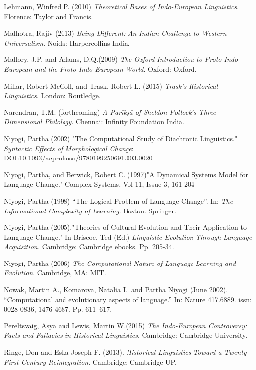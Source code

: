 \begin{thebibliography}{99}
  Lehmann, Winfred P. (2010) \textit{Theoretical Bases of Indo-European Linguistics}. Florence: Taylor and Francis.

  Malhotra, Rajiv (2013) \textit{Being Different: An Indian Challenge to Western Universalism}. Noida: Harpercollins India.

  Mallory, J.P. and Adams, D.Q.(2009) \textit{The Oxford Introduction to Proto-Indo-European and the Proto-Indo-European World}. Oxford: Oxford.

  Millar, Robert McColl, and Trask, Robert L. (2015) \textit{Trask's Historical Linguistics}. London: Routledge.

  Narendran, T.M. (forthcoming) \textit{A Parīkṣā of Sheldon Pollock’s Three Dimensional Philology}. Chennai: Infinity Foundation India.

  Niyogi, Partha (2002) "The Computational Study of Diachronic Linguistics." \textit{Syntactic Effects of Morphological Change}: DOI:10.1093/acprof:oso/9780199250691.003.0020

  Niyogi, Partha, and Berwick, Robert C. (1997)"A Dynamical Systems Model for Language Change." Complex Systems, Vol 11, Issue 3, 161-204

  Niyogi, Partha (1998) “The Logical Problem of Language Change”. In: \textit{The Informational Complexity of Learning}. Boston: Springer.

  Niyogi, Partha (2005)."Theories of Cultural Evolution and Their Application to Language Change." In Briscoe, Ted (Ed.) \textit{Linguistic Evolution Through Language Acquisition.} Cambridge: Cambridge ebooks. Pp. 205-34.

  Niyogi, Partha (2006) \textit{The Computational Nature of Language Learning and Evolution}. Cambridge, MA: MIT.

  Nowak, Martin A., Komarova, Natalia L. and Partha Niyogi (June 2002). “Computational and evolutionary aspects of language.” In: Nature 417.6889. issn: 0028-0836, 1476-4687. Pp. 611–617.

  Pereltsvaig, Asya and Lewis, Martin W.(2015) \textit{The Indo-European Controversy: Facts and Fallacies in Historical Linguistics}. Cambridge: Cambridge University.

  Ringe, Don and Eska Joseph F. (2013). \textit{Historical Linguistics Toward a Twenty-First Century Reintegration}. Cambridge: Cambridge UP.


\end{thebibliography}
